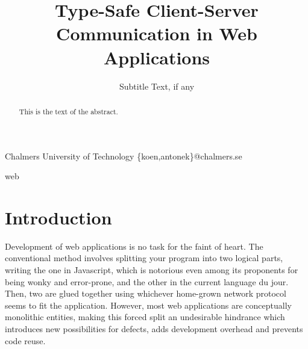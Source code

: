 \documentclass[preprint]{sigplanconf}
\begin{document}
\setlength{\pdfpageheight}{\paperheight}
\setlength{\pdfpagewidth}{\paperwidth}






\title{Type-Safe Client-Server Communication in Web Applications}
\subtitle{Subtitle Text, if any}

           {Chalmers University of Technology}
           {\{koen,antonek\}@chalmers.se}

\maketitle

\begin{abstract}
This is the text of the abstract.
\end{abstract}


%
\keywords
web

\section{Introduction}

Development of web applications is no task for the faint of heart.
The conventional method involves splitting your program into two logical parts,
writing the one in Javascript, which is notorious even among its proponents for
being wonky and error-prone, and the other in the current language du jour.
Then, two are glued together using whichever home-grown network protocol seems
to fit the application. However, most web applications are conceptually
monolithic entities, making this forced split an undesirable hindrance which
introduces new possibilities for defects, adds development overhead and
prevents code reuse.
\end{document}
